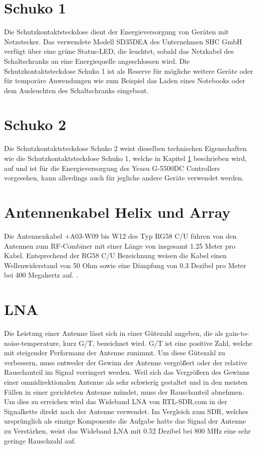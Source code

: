 \section{Schuko 1}
\label{sec:schuko1}
Die Schutzkontaktsteckdose dient der Energieversorgung von Geräten mit Netzstecker. Das verwendete Modell SD35DEA des Unternehmen SHC GmbH verfügt über eine grüne Status-LED, die leuchtet, sobald das Netzkabel des Schaltschranks an eine Energiequelle angeschlossen wird. Die Schutzkontaktsteckdose Schuko 1 ist als Reserve für mögliche weitere Geräte oder für temporäre Anwendungen wie zum Beispiel das Laden eines Notebooks oder dem Ausleuchten des Schaltschranks eingebaut.

\section{Schuko 2}
\label{sec:schuko2}
Die Schutzkontaktsteckdose Schuko 2 weist dieselben technischen Eigenschaften wie die Schutzkontaktsteckdose Schuko 1, welche in Kapitel \ref{sec:schuko1} beschrieben wird, auf und ist für die Energieversorgung des Yeasu G-5500DC Controllers vorgesehen, kann allerdings auch für jegliche andere Geräte verwendet werden.

\section{Antennenkabel Helix und Array}
\label{sec:Antennenkabel-Helix}
Die Antennenkabel +A03-W09 bis W12 des Typ RG58 C/U führen von den Antennen zum RF-Combiner mit einer Länge von insgesamt 1.25 Meter pro Kabel. Entsprechend der RG58 C/U Bezeichnung weisen die Kabel einen Wellenwiderstand von 50 Ohm \cite{noauthor_rg_nodate} sowie eine Dämpfung von 0.3 Dezibel pro Meter bei 400 Megahertz auf. \cite{noauthor_vergleich_nodate}. 

\section{LNA}
\label{sec:LNA}
Die Leistung einer Antenne lässt sich in einer Gütezahl angeben, die als gain-to-noise-temperature, kurz G/T, bezeichnet wird. G/T ist eine positive Zahl, welche mit steigender Performanz der Antenne zunimmt. Um diese Gütezahl zu verbessern, muss entweder der Gewinn der Antenne vergrößert oder der relative Rauschanteil im Signal verringert werden. Weil sich das Vergrößern des Gewinns einer omnidirektionalen Antenne als sehr schwierig gestaltet und in den meisten Fällen in einer gerichteten Antenne mündet, muss der Rauschanteil abnehmen. Um dies zu erreichen wird das Wideband LNA von RTL-SDR.com in der Signalkette direkt nach der Antenne verwendet. Im Vergleich zum SDR, welches ursprünglich als einzige Komponente die Aufgabe hatte das Signal der Antenne zu Verstärken, weist das Wideband LNA mit 0.52 Dezibel bei 800 MHz eine sehr geringe Rauschzahl auf. \cite{noauthor_new_nodate} \cite{noauthor_omnidirectional_nodate}

